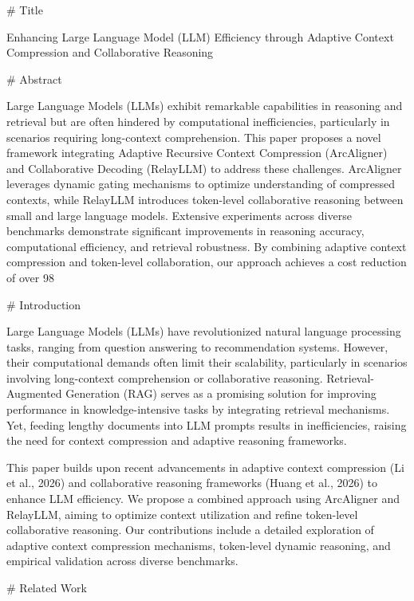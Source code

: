 # Title

Enhancing Large Language Model (LLM) Efficiency through Adaptive Context Compression and Collaborative Reasoning

# Abstract

Large Language Models (LLMs) exhibit remarkable capabilities in reasoning and retrieval but are often hindered by computational inefficiencies, particularly in scenarios requiring long-context comprehension. This paper proposes a novel framework integrating Adaptive Recursive Context Compression (ArcAligner) and Collaborative Decoding (RelayLLM) to address these challenges. ArcAligner leverages dynamic gating mechanisms to optimize understanding of compressed contexts, while RelayLLM introduces token-level collaborative reasoning between small and large language models. Extensive experiments across diverse benchmarks demonstrate significant improvements in reasoning accuracy, computational efficiency, and retrieval robustness. By combining adaptive context compression and token-level collaboration, our approach achieves a cost reduction of over 98%

# Introduction

Large Language Models (LLMs) have revolutionized natural language processing tasks, ranging from question answering to recommendation systems. However, their computational demands often limit their scalability, particularly in scenarios involving long-context comprehension or collaborative reasoning. Retrieval-Augmented Generation (RAG) serves as a promising solution for improving performance in knowledge-intensive tasks by integrating retrieval mechanisms. Yet, feeding lengthy documents into LLM prompts results in inefficiencies, raising the need for context compression and adaptive reasoning frameworks.

This paper builds upon recent advancements in adaptive context compression (Li et al., 2026) and collaborative reasoning frameworks (Huang et al., 2026) to enhance LLM efficiency. We propose a combined approach using ArcAligner and RelayLLM, aiming to optimize context utilization and refine token-level collaborative reasoning. Our contributions include a detailed exploration of adaptive context compression mechanisms, token-level dynamic reasoning, and empirical validation across diverse benchmarks.

# Related Work

